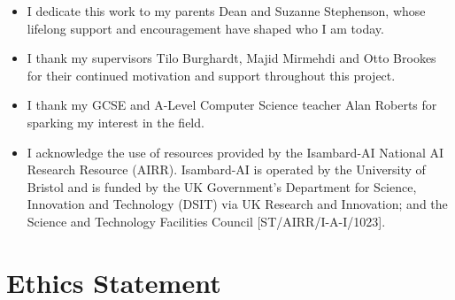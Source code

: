 \documentclass[author={Jacob Stephenson},
    degree={BSc},
    title={Robust Great Ape Species Detection in Wild Camera Trap Imagery with Promptable Concept Segmentation},
    unit={COMS30045},
    subtitle={}]{dissertation}
\begin{document}
\begin{itemize}
    \item I dedicate this work to my parents Dean and Suzanne Stephenson, whose lifelong support and encouragement have shaped who I am today.
    \item I thank my supervisors Tilo Burghardt, Majid Mirmehdi and Otto Brookes for their continued motivation and support throughout this project.
    \item I thank my GCSE and A-Level Computer Science teacher Alan Roberts for sparking my interest in the field.
    \item I acknowledge the use of resources provided by the Isambard-AI National AI Research Resource (AIRR). Isambard-AI is operated by the University of Bristol and is funded by the UK Government’s Department for Science, Innovation and Technology (DSIT) via UK Research and Innovation; and the Science and Technology Facilities Council [ST/AIRR/I-A-I/1023]. \cite{mcintoshsmith2024isambardaileadershipclasssupercomputer}
\end{itemize}





\makedecl




\makeaidecl





\tableofcontents
\listoffigures
\listoftables




\chapter*{Ethics Statement}
\end{document}

